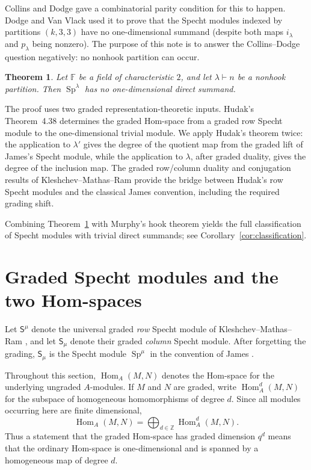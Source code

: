 \documentclass[11pt,reqno]{amsart}
\numberwithin{equation}{section}
\newtheorem{theorem}{Theorem}[section]
\theoremstyle{remark}
\newcommand{\F}{\mathbb F}
\newcommand{\Hom}{\operatorname{Hom}}
\newcommand{\JSp}{\operatorname{Sp}}
\newcommand{\RS}{\mathsf S}
\newcommand{\CS}{\mathsf S}
\begin{document}
Collins and Dodge \cite[Theorem~3.5]{CollinsDodge} gave a combinatorial parity condition for this to happen.  Dodge and Van Vlack \cite{DodgeVanVlack} used it to prove that the Specht modules indexed by partitions $(k,3,3)$ have no one-dimensional summand (despite both maps $i_\lambda$ and $p_\lambda$ being nonzero).  The purpose of this note is to answer the Collins--Dodge question negatively: no nonhook partition can occur.

\begin{theorem}\label{thm:main}
Let $\F$ be a field of characteristic $2$, and let $\lambda\vdash n$ be a nonhook partition.  Then $\JSp^\lambda$ has no one-dimensional direct summand.
\end{theorem}

The proof uses two graded representation-theoretic inputs.  Hudak's Theorem~4.38 \cite{Hudak} determines the graded Hom-space from a graded row Specht module to the one-dimensional trivial module.  We apply Hudak's theorem twice: the application to $\lambda'$ gives the degree of the quotient map from the graded lift of James's Specht module, while the application to $\lambda$, after graded duality, gives the degree of the inclusion map.  The graded row/column duality and conjugation results of Kleshchev--Mathas--Ram \cite{KMR} provide the bridge between Hudak's row Specht modules and the classical James convention, including the required grading shift.

Combining Theorem~\ref{thm:main} with Murphy's hook theorem yields the full classification of Specht modules with trivial direct summands; see Corollary~\ref{cor:classification}. 

\section{Graded Specht modules and the two Hom-spaces}

Let $\RS^\mu$ denote the universal graded \emph{row} Specht module of Kleshchev--Mathas--Ram \cite{KMR}, and let $\CS_\mu$ denote their graded \emph{column} Specht module.  After forgetting the grading, $\CS_\mu$ is the Specht module $\JSp^\mu$ in the convention of James \cite[p.~1246]{KMR}.

Throughout this section, $\Hom_A(M,N)$ denotes the Hom-space for the underlying ungraded $A$-modules.  If $M$ and $N$ are graded, write $\Hom_A^d(M,N)$ for the subspace of homogeneous homomorphisms of degree $d$.  Since all modules occurring here are finite dimensional,
\[
\Hom_A(M,N)=\bigoplus_{d\in\mathbb Z}\Hom_A^d(M,N).
\]
Thus a statement that the graded Hom-space has graded dimension $q^d$ means that the ordinary Hom-space is one-dimensional and is spanned by a homogeneous map of degree $d$.
\end{document}
